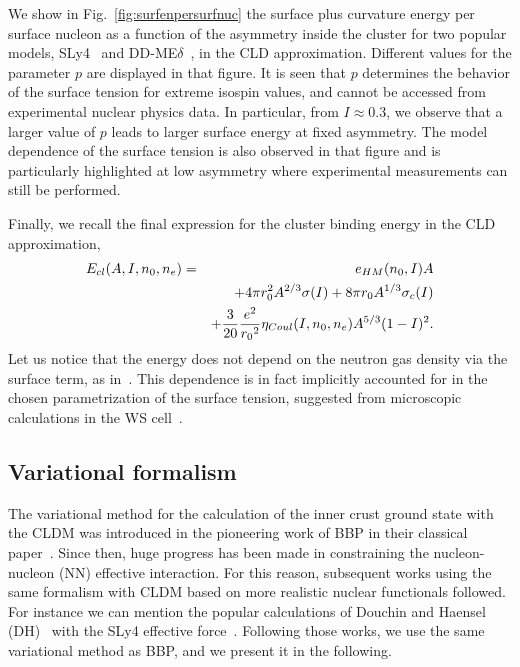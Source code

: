 %
We show in Fig.~\ref{fig:surfenpersurfnuc} the surface plus curvature energy
per surface nucleon as a function of the asymmetry inside the cluster for two
popular models, SLy4~\cite{Chabanat1998} and DD-ME$\delta$~\cite{RocaMaza2011},
in the CLD approximation. Different values for the parameter $p$ are displayed 
in that figure. It is seen that $p$ determines the behavior of the surface
tension for extreme isospin values, and cannot be accessed from experimental
nuclear physics data.  In particular, from $I \approx 0.3$, we observe that a 
larger value of $p$ leads to larger surface energy at fixed asymmetry. The
model dependence of the surface tension is also observed in that figure and is
particularly highlighted at low asymmetry where experimental measurements can 
still be performed.

Finally, we recall the final expression for the cluster binding energy in the
CLD approximation,
%
\begin{eqnarray}
  E_{cl}(A,I,n_0,n_e) =&& e_{HM}(n_0, I)A \notag \\
          &&+ 4\pi r_0^2A^{2/3}\sigma(I) + 8\pi r_0A^{1/3}\sigma_c(I) \notag \\
          &&+ \frac{3}{20}\frac{e^2}{{r_0}^2}\eta_{Coul}(I,n_0,n_e)A^{5/3}(1-I)^2.
          \label{eq:enuc}
\end{eqnarray}
%
Let us notice that the energy does not depend on the neutron gas density via
the surface term, as in~\cite{BBP}. This dependence is in fact implicitly
accounted for in the chosen parametrization of the surface tension, suggested 
from microscopic calculations in the WS cell~\cite{Ravenhall1983}.

\subsection{Variational formalism}\label{subsec:formalism}

The variational method for the calculation of the inner crust ground state
with the CLDM was introduced in the pioneering work of BBP 
in their classical paper~\cite{BBP}. Since then, huge progress has been
made in constraining the nucleon-nucleon (NN) effective interaction. For this 
reason, subsequent works using the same formalism with CLDM based on more 
realistic nuclear functionals followed. For instance we can mention the popular 
calculations of Douchin and Haensel (DH)~\cite{Douchin2000a, Douchin2000b} with 
the SLy4 effective force~\cite{Chabanat1998}. Following those works, we use the 
same variational method as BBP, and we present it in the following.

